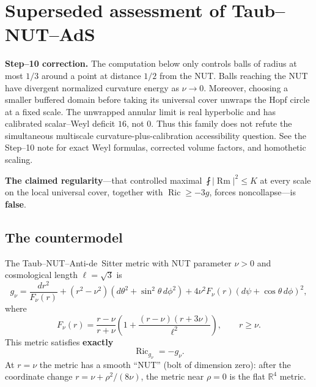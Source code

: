 
\section{Superseded assessment of Taub--NUT--AdS}

\textbf{Step--10 correction.}  The computation below only controls balls of
radius at most $1/3$ around a point at distance $1/2$ from the NUT.  Balls
reaching the NUT have divergent normalized curvature energy as $\nu\to0$.
Moreover, choosing a smaller buffered domain before taking its universal
cover unwraps the Hopf circle at a fixed scale.  The unwrapped annular limit
is real hyperbolic and has calibrated scalar--Weyl deficit $16$, not $0$.
Thus this family does not refute the simultaneous multiscale
curvature-plus-calibration accessibility question.  See the Step--10 note for
exact Weyl formulas, corrected volume factors, and homothetic scaling.

\textbf{The claimed regularity}---that controlled maximal $\fint|\operatorname{Rm}|^2 \le K$
at every scale on the local universal cover, together with $\operatorname{Ric}\ge-3g$,
forces noncollapse---is \textbf{false}.

\subsection{The countermodel}
The Taub--NUT--Anti-de~Sitter metric with NUT parameter $\nu>0$
and cosmological length $\ell=\sqrt3$ is
\[
g_\nu = \frac{dr^2}{F_\nu(r)}
+ (r^2-\nu^2)(d\theta^2+\sin^2\theta\,d\phi^2)
+ 4\nu^2 F_\nu(r)(d\psi+\cos\theta\,d\phi)^2,
\]
where
\[
F_\nu(r) = \frac{r-\nu}{r+\nu}
\left(1+\frac{(r-\nu)(r+3\nu)}{\ell^2}\right),
\qquad r\ge\nu.
\]
This metric satisfies \textbf{exactly}
\[
\operatorname{Ric}_{g_\nu} = -g_\nu.
\]
At $r=\nu$ the metric has a smooth ``NUT'' (bolt of dimension zero):
after the coordinate change $r=\nu+\rho^2/(8\nu)$,
the metric near $\rho=0$ is the flat $\mathbb R^4$ metric.

